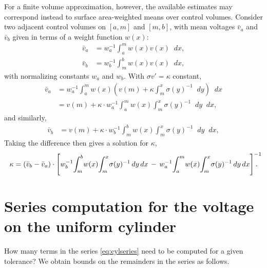 \documentclass[parskip=half]{scrartcl}
\newcommand{\Int}[2]{\int_{#1}^{#2}\!}
\newcommand{\D}{\mathop{}\!d}
\theoremstyle{nonumberplain}
\begin{document}
For a finite volume approximation, however, the available
estimates may correspond instead to surface area-weighted means
over control volumes. Consider two adjacent control volumes
on $[a, m]$ and $[m, b]$, with mean voltages $\bar v_a$ and
$\bar v_b$ given in terms of a weight function $w(x)$:
\begin{align}
    \bar v_a &= w_a^{-1} \Int{a}{m} w(x)v(x) \D x,\\
    \bar v_b &= w_b^{-1} \Int{m}{b} w(x)v(x) \D x,
\end{align}
with normalizing constants $w_a$ and $w_b$. With $\sigma v' = \kappa$
constant,
\begin{equation}
    \begin{aligned}
        \bar v_a
        &= w_a^{-1} \Int{a}{m} w(x) \left( v(m) + \kappa \Int{m}{x} \sigma(y)^{-1} \D y \right) \D x \\
        &= v(m) + \kappa \cdot w_a^{-1} \Int{a}{m} w(x) \Int{m}{x} \sigma(y)^{-1} \D y \D x,
    \end{aligned}
\end{equation}
and similarly, 
\begin{equation}
    \begin{aligned}
        \bar v_b
        &= v(m) + \kappa \cdot w_b^{-1} \Int{m}{b} w(x) \Int{m}{x} \sigma(y)^{-1} \D y \D x,
    \end{aligned}
\end{equation}
Taking the difference then gives a solution for $\kappa$,
\begin{equation}
    \kappa = (\bar v_b - \bar v_a) \cdot \left[
        w_b^{-1}\!\Int{m}{b} w(x)\! \Int{m}{x} \sigma(y)^{-1} \D y \D x\,-\,
        w_a^{-1}\!\Int{a}{m} w(x)\! \Int{m}{x} \sigma(y)^{-1} \D y \D x
        \right]^{\mathrlap{-1}}.
\end{equation}

\newpage
\appendix
\section{Series computation for the voltage on the uniform cylinder}
\label{ap:cylcomp}

How many terms in the series \eqref{eq:cylseries} need to be computed for a given tolerance?
We obtain bounds on the remainders in the series as follows.
\end{document}
